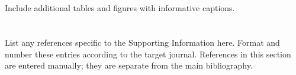 \clearpage
\section{\SITitleFour}\label{si:tables}
Include additional tables and figures with informative captions.

\clearpage
\section{\SITitleFive}\label{si:references}
List any references specific to the Supporting Information here. Format and
number these entries according to the target journal. References in this
section are entered manually; they are separate from the main bibliography.
